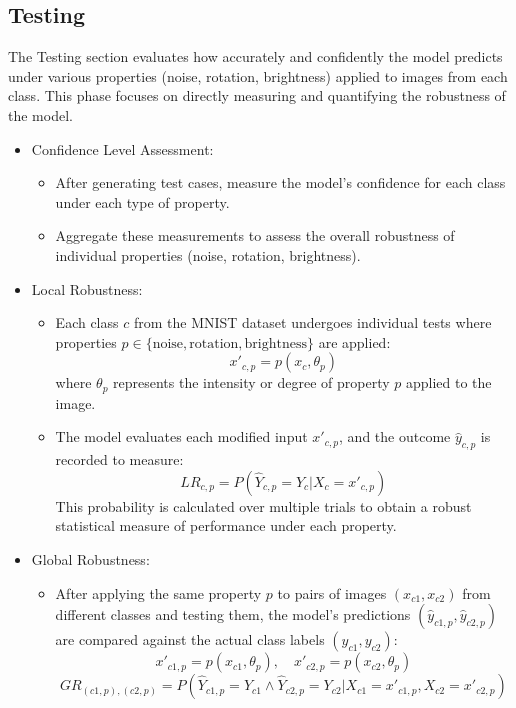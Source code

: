\documentclass[10pt, conference, a4paper, final]{IEEEtran}
\begin{document}
\subsection{Testing }

The Testing section evaluates how accurately and confidently the model predicts under various properties (noise, rotation, brightness) applied to images from each class. This phase focuses on directly measuring and quantifying the robustness of the model.
\begin{itemize}

    \item Confidence Level Assessment:
        \begin{itemize}
            \item After generating test cases, measure the model’s confidence for each class under each type of property.
            \item Aggregate these measurements to assess the overall robustness of individual properties (noise, rotation, brightness).
        \end{itemize}

        \item Local Robustness:
        \begin{itemize}
            \item Each class \( c \) from the MNIST dataset undergoes individual tests where properties \( p \in \{ \text{noise}, \text{rotation}, \text{brightness} \} \) are applied:
            \[ x'_{c,p} = p(x_c, \theta_p) \]
            where \( \theta_p \) represents the intensity or degree of property \( p \) applied to the image.
            
            \item The model evaluates each modified input \( x'_{c,p} \), and the outcome \( \hat{y}_{c,p} \) is recorded to measure:
            \[ LR_{c,p} = P(\hat{Y}_{c,p} = Y_c | X_c = x'_{c,p}) \]
            This probability is calculated over multiple trials to obtain a robust statistical measure of performance under each property.
        \end{itemize}
        
        
        \item Global Robustness:
        \begin{itemize}
            \item After applying the same property \( p \) to pairs of images \((x_{c1}, x_{c2})\) from different classes and testing them, the model's predictions \((\hat{y}_{c1,p}, \hat{y}_{c2,p})\) are compared against the actual class labels \( (y_{c1}, y_{c2}) \):
            \[ x'_{c1,p} = p(x_{c1}, \theta_p), \quad x'_{c2,p} = p(x_{c2}, \theta_p) \]
            {\footnotesize
            \[ GR_{(c1, p), (c2, p)} = P(\hat{Y}_{c1,p} = Y_{c1} \land \hat{Y}_{c2,p} = Y_{c2} | X_{c1} = x'_{c1,p}, X_{c2} = x'_{c2,p}) \]
            }
        \end{itemize}
               
        
\end{itemize}
\end{document}

